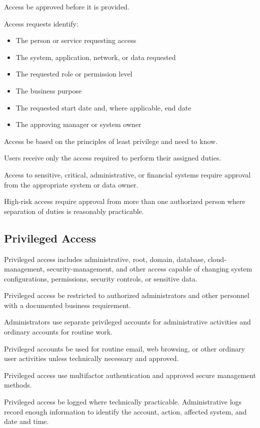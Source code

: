 Access \must{} be approved before it is provided.

Access requests \must{} identify:
\begin{itemize}
    \item The person or service requesting access
    \item The system, application, network, or data requested
    \item The requested role or permission level
    \item The business purpose
    \item The requested start date and, where applicable, end date
    \item The approving manager or system owner
\end{itemize}

Access \must{} be based on the principles of least privilege and need to know.

Users \must{} receive only the access required to perform their assigned duties.

Access to sensitive, critical, administrative, or financial systems \must{} require approval from the appropriate system or data owner.

High-risk access \should{} require approval from more than one authorized person where separation of duties is reasonably practicable.

\subsection{Privileged Access}

Privileged access includes administrative, root, domain, database, cloud-management, security-management, and other access capable of changing system configurations, permissions, security controls, or sensitive data.

Privileged access \must{} be restricted to authorized administrators and other personnel with a documented business requirement.

Administrators \must{} use separate privileged accounts for administrative activities and ordinary accounts for routine work.

Privileged accounts \mustnot{} be used for routine email, web browsing, or other ordinary user activities unless technically necessary and approved.

Privileged access \should{} use multifactor authentication and approved secure management methods.

Privileged access \must{} be logged where technically practicable. Administrative logs \must{} record enough information to identify the account, action, affected system, and date and time.

